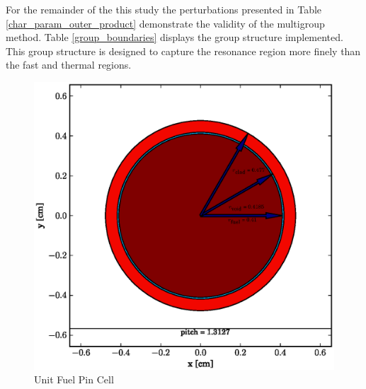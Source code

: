 For the remainder of the this study the perturbations presented in Table \ref{char_param_outer_product}
demonstrate the validity of the multigroup method.  Table \ref{group_boundaries} 
displays the group structure implemented.  This group structure is designed to capture the resonance 
region more finely than the fast and thermal regions.  

\begin{figure}[htbp]
\caption{Unit Fuel Pin Cell}
\label{fuel_pin_cell}
\begin{center}
\includegraphics[scale=0.5]{multigroup_method/figs/fuel_pin_cell.eps}
\end{center}
\end{figure}
